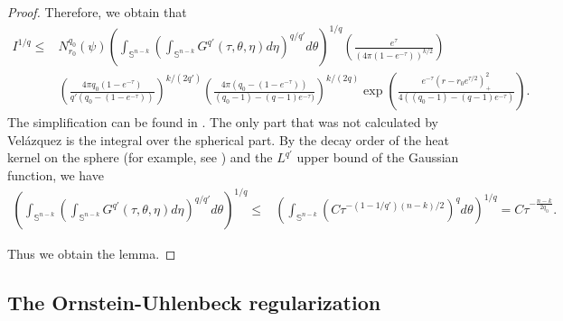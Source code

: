 \documentclass[11pt]{amsart}
\numberwithin{equation}{section}
\numberwithin{equation}{section}
\newcommand{\bS}{\mathbb{S}}
\begin{document}
\begin{proof}
		Therefore, we obtain that
		\[
		\begin{split}
			I^{1/q}
			\leq &
			N^{q_0}_{r_0}(\psi)
			\left(
			\int_{\bS^{n-k}}\left(
			\int_{\bS^{n-k}} G^{q'}(\tau,\theta,\eta)
			d\eta
			\right)^{q/q'}d\theta\right)^{1/q}
			\left(\frac{e^\tau}{(4\pi(1-e^{-\tau}))^{k/2}}\right)
			\\
			&
			\left(\frac{4\pi q_0 (1-e^{-\tau})}{q'(q_0-(1-e^{-\tau}))} \right)^{k/(2q')}
			\left(\frac{4\pi(q_0- (1-e^{-\tau}))}{(q_0-1)-(q-1)e^{-\tau})} \right)^{k/(2q)}
			\exp\left(
			\frac{e^{-\tau}(r-r_0e^{\tau/2})_+^2}{4((q_0-1)-(q-1)e^{-\tau})}
			\right).
		\end{split}
		\]
		The simplification can be found in \cite[page 1573]{V1}. The only part that was not calculated by Vel\'azquez is the integral over the spherical part. By the decay order of the heat kernel on the sphere (for example, see \cite{NSS19_SphereHeatKernel}) and the $L^{q'}$ upper bound of the Gaussian function, we have 
		\begin{align*}
			\left(
			\int_{\bS^{n-k}}\left(
			\int_{\bS^{n-k}} G^{q'}(\tau,\theta,\eta)
			d\eta
			\right)^{q/q'}d\theta\right)^{1/q}
			\leq &
			\left(
			\int_{\bS^{n-k}}\left(
			C\tau^{-(1-1/q')(n-k)/2}
			\right)^{q}d\theta\right)^{1/q}
			=
			C \tau^{-\frac{n-k}{2q_0}}.
		\end{align*}
		
		Thus we obtain the lemma.
	\end{proof}
	
	
	\bigskip
	
	\subsection{The Ornstein-Uhlenbeck regularization}\label{SSOU}
	
\end{document}
